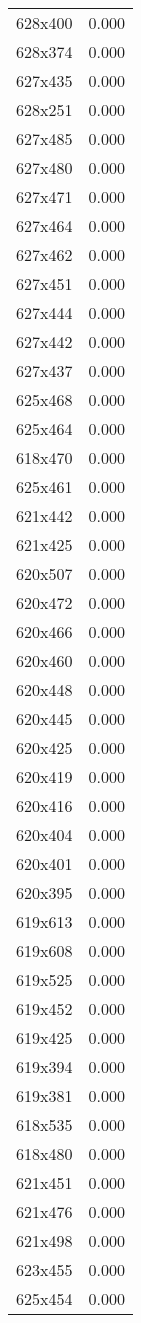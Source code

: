 \begin{table}
\begin{tabular}{lr}
628x400 & 0.000 \\
628x374 & 0.000 \\
627x435 & 0.000 \\
628x251 & 0.000 \\
627x485 & 0.000 \\
627x480 & 0.000 \\
627x471 & 0.000 \\
627x464 & 0.000 \\
627x462 & 0.000 \\
627x451 & 0.000 \\
627x444 & 0.000 \\
627x442 & 0.000 \\
627x437 & 0.000 \\
625x468 & 0.000 \\
625x464 & 0.000 \\
618x470 & 0.000 \\
625x461 & 0.000 \\
621x442 & 0.000 \\
621x425 & 0.000 \\
620x507 & 0.000 \\
620x472 & 0.000 \\
620x466 & 0.000 \\
620x460 & 0.000 \\
620x448 & 0.000 \\
620x445 & 0.000 \\
620x425 & 0.000 \\
620x419 & 0.000 \\
620x416 & 0.000 \\
620x404 & 0.000 \\
620x401 & 0.000 \\
620x395 & 0.000 \\
619x613 & 0.000 \\
619x608 & 0.000 \\
619x525 & 0.000 \\
619x452 & 0.000 \\
619x425 & 0.000 \\
619x394 & 0.000 \\
619x381 & 0.000 \\
618x535 & 0.000 \\
618x480 & 0.000 \\
621x451 & 0.000 \\
621x476 & 0.000 \\
621x498 & 0.000 \\
623x455 & 0.000 \\
625x454 & 0.000 \\

\end{tabular}
\end{table}
